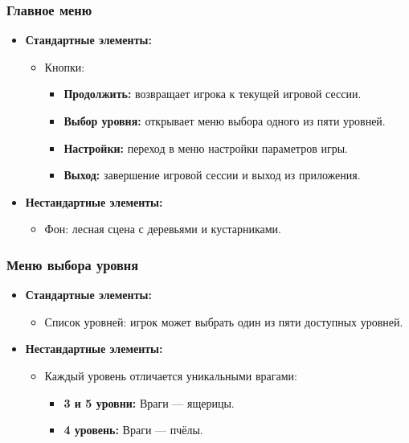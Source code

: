 \documentclass{article}
\begin{document}
\subsubsection{Главное меню}
\begin{itemize}
    \item \textbf{Стандартные элементы:}
    \begin{itemize}
        \item Кнопки:
        \begin{itemize}
            \item \textbf{Продолжить:} возвращает игрока к текущей игровой сессии.
            \item \textbf{Выбор уровня:} открывает меню выбора одного из пяти уровней.
            \item \textbf{Настройки:} переход в меню настройки параметров игры.
            \item \textbf{Выход:} завершение игровой сессии и выход из приложения.
        \end{itemize}
    \end{itemize}
    \item \textbf{Нестандартные элементы:}
    \begin{itemize}
        \item Фон: лесная сцена с деревьями и кустарниками.
    \end{itemize}
\end{itemize}

\subsubsection{Меню выбора уровня}
\begin{itemize}
    \item \textbf{Стандартные элементы:}
    \begin{itemize}
        \item Список уровней: игрок может выбрать один из пяти доступных уровней.
    \end{itemize}
    \item \textbf{Нестандартные элементы:}
    \begin{itemize}
        \item Каждый уровень отличается уникальными врагами:
        \begin{itemize}
            \item \textbf{3 и 5 уровни:} Враги — ящерицы.
            \item \textbf{4 уровень:} Враги — пчёлы.
        \end{itemize}
    \end{itemize}
\end{itemize}
\end{document}
